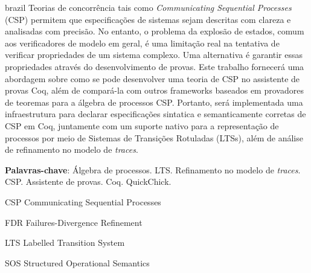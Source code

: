 \documentclass[
	12pt,				%
	a4paper,			%
	oneside,
	english			%
	]{abntex2}
\theoremstyle{definition}
\begin{document}
\begin{resumo}[Resumo]
 \begin{otherlanguage*}{brazil}
   Teorias de concorrência tais como \emph{Communicating Sequential Processes} (CSP) permitem que especificações de sistemas sejam descritas com clareza e analisadas com precisão. No entanto, o problema da explosão de estados, comum aos verificadores de modelo em geral, é uma limitação real na tentativa de verificar propriedades de um sistema complexo. Uma alternativa é garantir essas propriedades através do desenvolvimento de provas. Este trabalho fornecerá uma abordagem sobre como se pode desenvolver uma teoria de CSP no assistente de provas Coq, além de compará-la com outros frameworks baseados em provadores de teoremas para  a álgebra de processos CSP. Portanto, será implementada uma infraestrutura para declarar especificações sintatica e semanticamente corretas de CSP em Coq, juntamente com um suporte nativo para a representação de processos por meio de Sistemas de Transições Rotuladas (LTSs), além de análise de refinamento no modelo de \emph{traces}.
    
   \textbf{Palavras-chave}: Álgebra de processos. LTS. Refinamento no modelo de \emph{traces}. CSP. Assistente de provas. Coq. QuickChick.
 \end{otherlanguage*}
\end{resumo}

\listoffigures*
\cleardoublepage

\listoftables*
\cleardoublepage

\begin{siglas}
	\item[CSP] Communicating Sequential Processes
	\item[FDR] Failures-Divergence Refinement
	\item[LTS] Labelled Transition System
	\item[SOS] Structured Operational Semantics
\end{siglas}

\tableofcontents*
\cleardoublepage


\textual









\postextual


\end{document}
